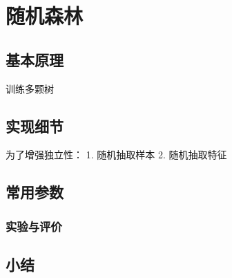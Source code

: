 \chapter{随机森林}

\section{基本原理}
训练多颗树

\section{实现细节}
为了增强独立性：
1. 随机抽取样本
2. 随机抽取特征

\section{常用参数}
\subsection{实验与评价}

\section{小结}
